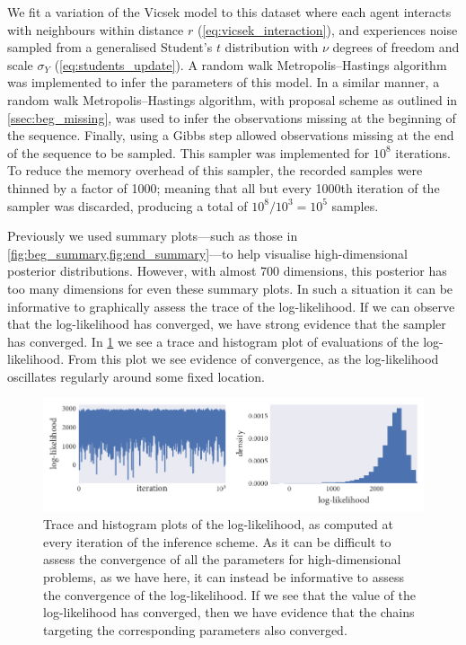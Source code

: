 We fit a variation of the Vicsek model to this dataset where each agent
interacts with neighbours within distance $r$ (\cref{eq:vicsek_interaction}),
and experiences noise sampled from a generalised Student's $t$ distribution
with $\nu$ degrees of freedom and scale $\sigma_Y$ (\cref{eq:students_update}).
A random walk Metropolis--Hastings algorithm was implemented to infer the
parameters of this model. In a similar manner, a random walk
Metropolis--Hastings algorithm, with proposal scheme as outlined in
\cref{ssec:beg_missing}, was used to infer the observations missing at the
beginning of the sequence. Finally, using a Gibbs step allowed observations
missing at the end of the sequence to be sampled. This sampler was implemented
for $10^8$ iterations. To reduce the memory overhead of this sampler, the
recorded samples were thinned by a factor of 1000; meaning that all but every
1000th iteration of the sampler was discarded, producing a total of $10^8 /
10^3 = 10^5$ samples.

Previously we used summary plots---such as those in
\cref{fig:beg_summary,fig:end_summary}---to help visualise high-dimensional
posterior distributions. However, with almost 700 dimensions, this posterior
has too many dimensions for even these summary plots. In such a situation it
can be informative to graphically assess the trace of the log-likelihood. If we
can observe that the log-likelihood has converged, we have strong evidence that
the sampler has converged. In \cref{fig:log_ll} we see a trace and histogram
plot of evaluations of the log-likelihood. From this plot we see evidence of
convergence, as the log-likelihood oscillates regularly around some fixed
location.

\begin{figure}[tb]
  \includegraphics{log_likelihood.pdf}
  \caption{Trace and histogram plots of the log-likelihood, as computed at
    every iteration of the inference scheme. As it can be difficult to assess
    the convergence of all the parameters for high-dimensional problems, as
    we have here, it can instead be informative to assess the convergence of
    the log-likelihood. If we see that the value of the log-likelihood has
    converged, then we have evidence that the chains targeting the corresponding
    parameters also converged.}
    \label{fig:log_ll}
\end{figure}

